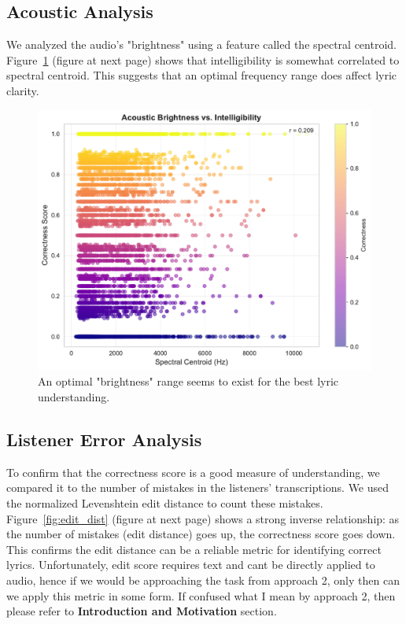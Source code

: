 \documentclass[conference]{IEEEtran}
\begin{document}
\subsection{Acoustic Analysis}
We analyzed the audio's "brightness" using a feature called the spectral centroid. Figure~\ref{fig:spectral} (figure at next page) shows that intelligibility is somewhat correlated to spectral centroid. This suggests that an optimal frequency range does affect lyric clarity.

\begin{figure}[htbp]
    \centering
    \includegraphics[width=\columnwidth]{plots_assignment_1/figure_5_spectral_centroid.pdf}
    \caption{An optimal "brightness" range seems to exist for the best lyric understanding.}
    \label{fig:spectral}
\end{figure}

\subsection{Listener Error Analysis}
To confirm that the correctness score is a good measure of understanding, we compared it to the number of mistakes in the listeners' transcriptions. We used the normalized Levenshtein edit distance to count these mistakes. Figure~\ref{fig:edit_dist} (figure at next page) shows a strong inverse relationship: as the number of mistakes (edit distance) goes up, the correctness score goes down. This confirms the edit distance can be a reliable metric for identifying correct lyrics. Unfortunately, edit score requires text and cant be directly applied to audio, hence if we would be approaching the task from approach 2, only then can we apply this metric in some form. If confused what I mean by approach 2, then please refer to \textbf{Introduction and Motivation} section.
\end{document}
